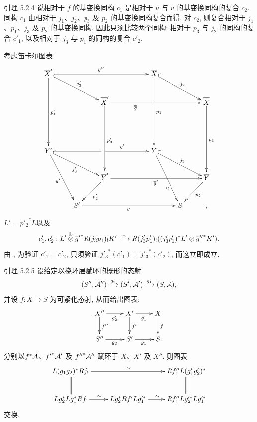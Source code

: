 引理 \hyperref[XVII.lem5.2.4]{5.2.4} 说相对于 $f$ 的基变换同构 $c_1$ 是相对于 $u$ 与 $v$ 的基变换同构的复合 $c_2$. 同构 $c_1$ 由相对于 $j_1$、$j_2$、$p_3$ 及 $p_2$ 的基变换同构复合而得. 对 $c_2$, 则复合相对于 $j_1$、$p_1$、$j_3$ 及 $p_2$ 的基变换同构. 因此只须比较两个同构: 相对于 $p_3$ 与 $j_2$ 的同构的复合 $c'_1$, 以及相对于 $j_3$ 与 $p_1$ 的同构的复合 $c'_2$.

考虑笛卡尔图表
\[
\xymatrix{
  \bar{X}' \ar[ddd]^{p'_1} \ar[rrrr]^{\bar{g}''} \ar@{^{(}->}[rrd]^{j'_2} &    &       &    & \bar{X}\ar@{^{(}->}[rrd]^{j_2} \ar[ddd]^{\sisi{}{p_1}}|(.38)\hole\\
                          & &\bar{\bar{X}}' \ar[rrrr]_(.3){\bar{\bar{g}}} \ar[ddd]^{p'_3}&   &&
& \bar{\bar{X}} \ar[ddd]^{\sisi{}{p_3}}\\
 & & &\\
  Y'  \ar@{^{(}->}[rrd]_{j'_3}\ar[rrrr]^(.7){g'}|(.52)\hole \ar[rdd]_{\sisi{v}{u}'} &    &&
& Y\ar[rdd]_(.65){\sisi{v}{u}} \ar@{^{(}->}[rrd]^{j_3}\\
  & &\bar{Y}' \ar[rrrr]_{\bar{g}'} \ar[ld]^{p'_2}&        &  & &\bar{Y}\ar[ld]^{p_2}\\
 &S'  \ar[rrrr]_{g} &&& & S &,
}
\]
$L'={p'_2}^{\ast}L$\pageoriginale 以及
\[
c'_{1}, c'_{2}: L'\overset{\mathbf{L}}{\otimes} {\overline{g}'}^{\ast}
R(j_{3}p_{1})_{!} K'\overset{\sim}{\longrightarrow}  R(j'_{3} p'_{1})_{!} ((j'_{3}
p'_{1})^{\ast} L'\otimes {\overline{g}''}^{\ast}K'){}.
\]
由 , 为验证 $c'_1=c'_2$, 只须验证 ${j'_3}^{\ast}(c'_1)={j'_3}^{\ast}(c'_2)$, 而这立即成立.

\begin{enonce*}{引理 5.2.5}
设给定以挠环层赋环的概形的态射
\[
(S'', {\mathcal A}'')\xrightarrow{g_{2}} (S',
{\mathcal A}')\xrightarrow{g_{1}} (S,{\mathcal A}){},
\]
并设 $f:X\rightarrow S$ 为可紧化态射, 从而给出图表:
\[
\xymatrix{
X'' \ar[r]_{g'_2} \ar[d]^{f''}& X' \ar[r]_{g'_1}\ar[d]^{f'}& X \ar[d]^{f}\\
S'' \ar[r]_{g_2}& S' \ar[r]_{g_1}& S \rlap{.}
}
\]
分别以\pageoriginale $f^{\ast}{\mathcal A}$、${f'}^{\ast}{\mathcal A}'$ 及 ${f''}^{\ast}{\mathcal A}''$ 赋环于 $X$、$X'$ 及 $X''$. 则图表
\[
\xymatrix{
L(g_1g_2)^{\ast}Rf_{!}  \ar[rr]^{\sim} \ar@{=}[d]&& Rf''_{!}L(g'_1g'_2)^{\ast}\ar@{=}[d]\\
Lg_{\sisi{1}{2}}^{\ast}Lg^{\ast}_{\sisi{2}{1}} R f_{!} \ar[r]^{\sim}& Lg^{\ast}_{\sisi{1}{2}} Rf'_{!}
L\sisi{g^\ast_2}{g'^\ast_1}  \ar[r]^{\sim} & Rf''_{!} Lg'^{\ast}_{\sisi{1}{2}}  L g'^{\ast}_{\sisi{2}{1}}
}
\]
交换.
\end{enonce*}

